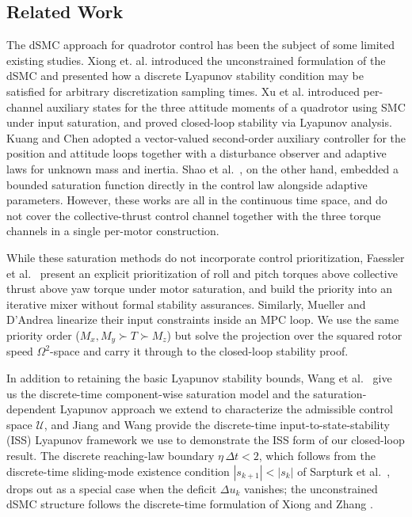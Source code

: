 \documentclass[conf]{new-aiaa}
\begin{document}
\subsection{Related Work}
The dSMC approach for quadrotor control has been the subject of some limited existing studies. Xiong et. al. \cite{refs:Xiong2016} introduced the unconstrained formulation of the dSMC and presented how a discrete Lyapunov stability condition may be satisfied for arbitrary discretization sampling times. Xu et al. \cite{refs:Xu2020} introduced per-channel auxiliary states for the three attitude moments of a quadrotor using SMC under input saturation, and proved closed-loop stability via Lyapunov analysis. Kuang and Chen \cite{refs:Kuang2024} adopted a vector-valued second-order auxiliary controller for the position and attitude loops together with a disturbance observer and adaptive laws for unknown mass and inertia. Shao et al.\ \cite{refs:Shao2022}, on the other hand, embedded a bounded saturation function directly in the control law alongside adaptive parameters. However, these works are all in the continuous time space, and do not cover the collective-thrust control channel together with the three torque channels in a single per-motor construction. 

While these saturation methods do not incorporate control prioritization, Faessler et al.\ \cite{refs:Faessler2017} present an explicit prioritization of roll and pitch torques above collective thrust above yaw torque under motor saturation, and build the priority into an iterative mixer without formal stability assurances. Similarly, Mueller and D’Andrea \cite{refs:Mueller2013} linearize their input constraints inside an MPC loop. We use the same priority order ($M_x, M_y \succ T \succ M_z$) but solve the projection over the squared rotor speed $\Omega^2$-space and carry it through to the closed-loop stability proof.

In addition to retaining the basic Lyapunov stability bounds, Wang et al.\ \cite{refs:Wang2005} give us the discrete-time component-wise saturation model and the saturation-dependent Lyapunov approach we extend to characterize the admissible control space $\mathcal{U}$, and Jiang and Wang \cite{refs:JiangWang2001} provide the discrete-time input-to-state-stability (ISS) Lyapunov framework we use to demonstrate the ISS form of our closed-loop result. The discrete reaching-law boundary $\eta\,\Delta t < 2$, which follows from the discrete-time sliding-mode existence condition $|s_{k+1}| < |s_k|$ of Sarpturk et al.\ \cite{refs:Sarpturk1987}, drops out as a special case when the deficit $\Delta u_k$ vanishes; the unconstrained dSMC structure follows the discrete-time formulation of Xiong and Zhang \cite{refs:Xiong2016}.
\end{document}
